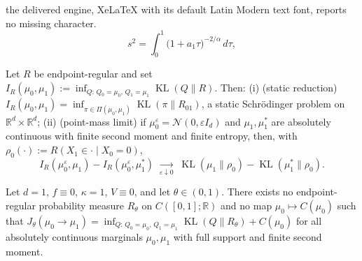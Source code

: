 \documentclass[10pt,a4paper]{amsart}
\newcommand{\KL}{\operatorname{KL}}
\newcommand{\RR}{\mathbb{R}}
\newcommand{\cN}{\mathcal{N}}
\begin{document}
the delivered engine, XeLaTeX with its default Latin Modern text font, reports no missing character.
		\begin{equation}
			\label{eq:shoot-pm}
			s^2=\int_0^1\bigl(1+a_1 \tau\bigr)^{-2/\alpha}\,d\tau,
		\end{equation}

	\begin{lemma}
		\label{lem:static}
		Let $R$ be endpoint-regular and set
		$I_R(\mu_0,\mu_1):=\inf_{Q:\,Q_0=\mu_0,\,Q_1=\mu_1}\KL(Q\|R)$. Then:
		(i) {(static reduction)}
		$I_R(\mu_0,\mu_1)=\inf_{\pi\in\Pi(\mu_0,\mu_1)}\KL(\pi\|R_{01})$, a static
		Schr\"odinger problem on $\RR^d\times\RR^d$;
		(ii) {(point-mass limit)} if $\mu_0^\varepsilon=\cN(0,\varepsilon I_d)$
		and $\mu_1,\mu_1^*$ are absolutely continuous with finite second moment and
		finite entropy, then, with $\rho_0(\cdot):=R(X_1\in\cdot\mid X_0=0)$,
		\begin{equation}
			\label{eq:pm-limit}
			I_R(\mu_0^\varepsilon,\mu_1)-I_R(\mu_0^\varepsilon,\mu_1^*)
			\;\xrightarrow[\varepsilon\downarrow0]{}\;
			\KL(\mu_1\|\rho_0)-\KL(\mu_1^*\|\rho_0).
		\end{equation}
	\end{lemma}

	\begin{proposition}
		\label{prop:no-kl}
		Let $d=1$, $f\equiv0$, $\kappa=1$, $V\equiv0$, and let $\theta\in(0,1)$.
		There exists no endpoint-regular probability measure $R_\theta$ on
		$C([0,1];\RR)$ and no map $\mu_0\mapsto C(\mu_0)$ such that
		$J_\theta(\mu_0\to\mu_1)=\inf_{Q:\,Q_0=\mu_0,\,Q_1=\mu_1}\KL(Q\|R_\theta)+C(\mu_0)$
		for all absolutely continuous marginals $\mu_0,\mu_1$ with full support and
		finite second moment.
	\end{proposition}
\end{document}
